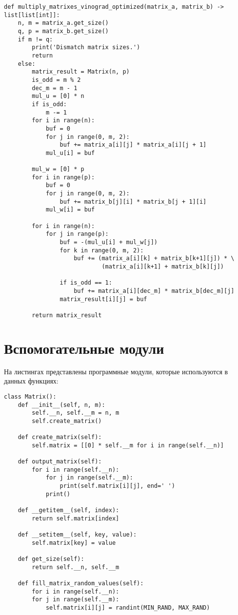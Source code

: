 \begin{lstlisting}[label=optim_vinograd, caption=Программный код оптимизированного алгоритма умножения матриц по Винограду.]
def multiply_matrixes_vinograd_optimized(matrix_a, matrix_b) -> list[list[int]]:
	n, m = matrix_a.get_size()
	q, p = matrix_b.get_size()
	if m != q:
		print('Dismatch matrix sizes.')
		return
	else:
		matrix_result = Matrix(n, p)
		is_odd = m % 2
		dec_m = m - 1
		mul_u = [0] * n
		if is_odd:
			m -= 1
		for i in range(n):
			buf = 0
			for j in range(0, m, 2):
				buf += matrix_a[i][j] * matrix_a[i][j + 1]
			mul_u[i] = buf
		
		mul_w = [0] * p
		for i in range(p):
			buf = 0
			for j in range(0, m, 2):
				buf += matrix_b[j][i] * matrix_b[j + 1][i]
			mul_w[i] = buf
		
		for i in range(n):
			for j in range(p):
				buf = -(mul_u[i] + mul_w[j])
				for k in range(0, m, 2):
					buf += (matrix_a[i][k] + matrix_b[k+1][j]) * \
							(matrix_a[i][k+1] + matrix_b[k][j])
		
				if is_odd == 1:
					buf += matrix_a[i][dec_m] * matrix_b[dec_m][j]
				matrix_result[i][j] = buf
		
		return matrix_result
\end{lstlisting}

\section{Вспомогательные модули}
На листингах представлены программные модули, которые используются в данных функциях:
\begin{lstlisting}[label=lst:struct_matrix,caption=Программный код класса по работе с матрицами.]	
class Matrix():
	def __init__(self, n, m):
		self.__n, self.__m = n, m
		self.create_matrix()
	
	def create_matrix(self):
		self.matrix = [[0] * self.__m for i in range(self.__n)]
	
	def output_matrix(self):
		for i in range(self.__n):
			for j in range(self.__m):
				print(self.matrix[i][j], end=' ')
			print()
	
	def __getitem__(self, index):
		return self.matrix[index]
	
	def __setitem__(self, key, value):
		self.matrix[key] = value
	
	def get_size(self):
		return self.__n, self.__m
	
	def fill_matrix_random_values(self):
		for i in range(self.__n):
		for j in range(self.__m):
			self.matrix[i][j] = randint(MIN_RAND, MAX_RAND)
\end{lstlisting}

